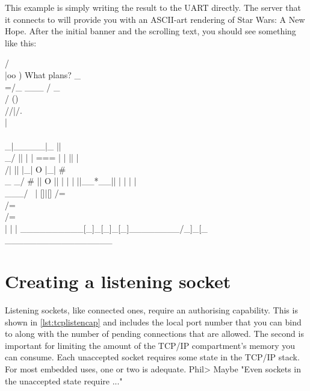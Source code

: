 This example is simply writing the result to the UART directly.
The server that it connects to will provide you with an ASCII-art rendering of Star Wars: A New Hope.
After the initial banner and the scrolling text, you should see something like this:

\begin{console}
                               /~\\                   
                              |oo )       What plans? 
                              _\\=/_                  
              ___            /  _  \\                 
             / ()\\          //|/.\\|\\\\                
           _|_____|_       ||  \\_/  ||               
          | | === | |      || |\\ /| ||               
          |_|  O  |_|      #  \\_ _/ #                
           ||  O  ||          | | |                   
           ||__*__||          | | |                   
          |~ \\___/ ~|         []|[]                  
          /=\\ /=\\ /=\\         | | |                  
__________[_]_[_]_[_]________/_]_[_\\_________________
\end{console}


\section{Creating a listening socket}

Listening sockets, like connected ones, require an authorising capability.
This is shown in \ref{lst:tcplistencap} and includes the local port number that you can bind to along with the number of pending connections that are allowed.
The second is important for limiting the amount of the TCP/IP compartment's memory you can consume.
Each unaccepted socket requires some state in the TCP/IP stack.
For most embedded uses, one or two is adequate.
Phil> Maybe "Even sockets in the unaccepted state require ..." 


